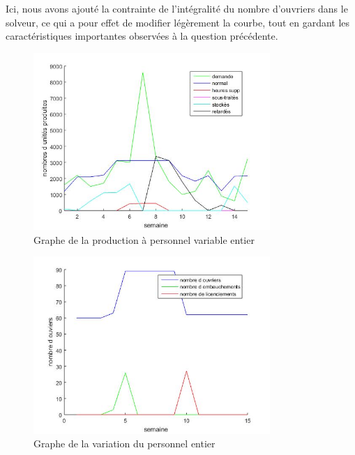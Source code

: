 Ici, nous avons ajouté la contrainte de l'intégralité du nombre d'ouvriers dans le solveur, ce qui a pour effet de modifier légèrement la courbe, tout en gardant les caractéristiques importantes observées à la question précédente.

\begin{figure}[H]
    \centering
    \includegraphics[width=0.8\textwidth]{graphes/graphq9.jpg}
    \caption{Graphe de la production à personnel variable entier}
    \label{fig:q8_01}
\end{figure}

\begin{figure}[H]
    \centering
    \includegraphics[width=0.8\textwidth]{graphes/ouvrierq9.jpg}
    \caption{Graphe de la variation du personnel entier}
    \label{fig:q8_02}
\end{figure}
